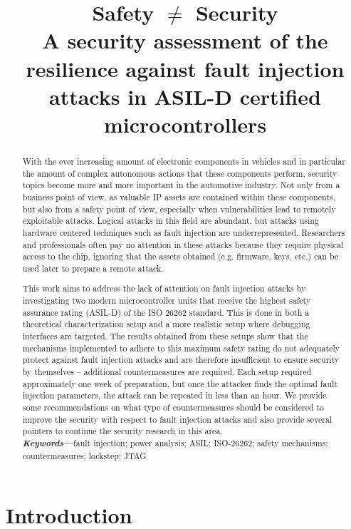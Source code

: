 \documentclass[a4paper, 10pt]{IEEEtran}
\author{\IEEEauthorblockN{Nils Wiersma, Ramiro Pareja \\}
\IEEEauthorblockA{Riscure Security Lab\\
\{wiersma, pareja\} @ riscure.com}}
\title{Safety $\neq$ Security \\
{\large A security assessment of the resilience against fault injection attacks in ASIL-D certified microcontrollers} \\
}
\date{}
\begin{document}
\maketitle

\thispagestyle{plain}
\pagestyle{plain}

\begin{abstract}
With the ever increasing amount of electronic components in vehicles and in particular the amount of complex autonomous actions that these components perform, security topics become more and more important in the automotive industry. 
Not only from a business point of view, as valuable IP assets are contained within these components, but also from a safety point of view, especially when vulnerabilities lead to remotely exploitable attacks.
Logical attacks in this field are abundant, but attacks using hardware centered techniques such as fault injection are underrepresented. Researchers and professionals often pay no attention in these attacks because they require physical access to the chip, ignoring that the assets obtained (e.g. firmware, keys, etc.) can be used later to prepare a remote attack.      

This work aims to address the lack of attention on fault injection attacks by investigating two modern microcontroller units that receive the highest safety assurance rating (ASIL-D) of the ISO 26262 standard. This is done in both a theoretical characterization setup and a more realistic setup where debugging interfaces are targeted.
The results obtained from these setups show that the mechanisms implemented to adhere to this maximum safety rating do not adequately protect against fault injection attacks and are therefore insufficient to ensure security by themselves -- additional countermeasures are required. Each setup required approximately one week of preparation, but once the attacker finds the optimal fault injection parameters, the attack can be repeated in less than an hour. We provide some recommendations on what type of countermeasures should be considered to improve the security with respect to fault injection attacks and also provide several pointers to continue the security research in this area.\\

\textbf{\textit{Keywords---}}fault injection; power analysis; ASIL; ISO-26262; safety mechanisms; countermeasures; lockstep; JTAG
\end{abstract}

\section{Introduction}
\end{document}
